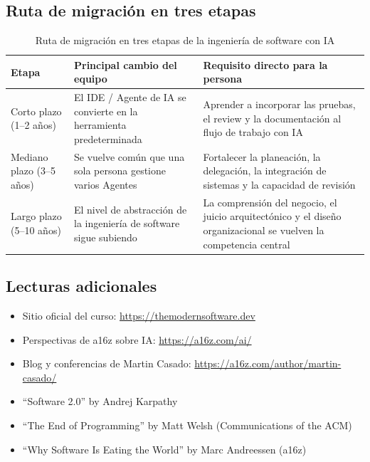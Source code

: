 \documentclass[a4paper]{article}
\begin{document}
\subsection{Ruta de migración en tres etapas}

\begin{table}[H]
\centering
\begin{tabular}{p{} p{} p{}}
\toprule
Etapa & Principal cambio del equipo & Requisito directo para la persona \\
\midrule
Corto plazo (1--2 años) & El IDE / Agente de IA se convierte en la herramienta predeterminada & Aprender a incorporar las pruebas, el review y la documentación al flujo de trabajo con IA \\
Mediano plazo (3--5 años) & Se vuelve común que una sola persona gestione varios Agentes & Fortalecer la planeación, la delegación, la integración de sistemas y la capacidad de revisión \\
Largo plazo (5--10 años) & El nivel de abstracción de la ingeniería de software sigue subiendo & La comprensión del negocio, el juicio arquitectónico y el diseño organizacional se vuelven la competencia central \\
\bottomrule
\end{tabular}
\caption{Ruta de migración en tres etapas de la ingeniería de software con IA}
\end{table}

\subsection{Lecturas adicionales}

\begin{itemize}
    \item Sitio oficial del curso: \url{https://themodernsoftware.dev}
    \item Perspectivas de a16z sobre IA: \url{https://a16z.com/ai/}
    \item Blog y conferencias de Martin Casado: \url{https://a16z.com/author/martin-casado/}
    \item ``Software 2.0'' by Andrej Karpathy
    \item ``The End of Programming'' by Matt Welsh (Communications of the ACM)
    \item ``Why Software Is Eating the World'' by Marc Andreessen (a16z)
\end{itemize}

\end{document}
